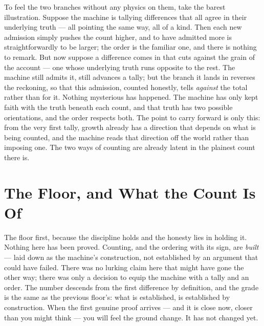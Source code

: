To feel the two branches without any physics on them, take the barest illustration. Suppose the machine is
tallying differences that all agree in their underlying truth --- all pointing the same way, all of a kind. Then
each new admission simply pushes the count higher, and to have admitted more is straightforwardly to be larger;
the order is the familiar one, and there is nothing to remark. But now suppose a difference comes in that cuts
against the grain of the account --- one whose underlying truth runs opposite to the rest. The machine still
admits it, still advances a tally; but the branch it lands in reverses the reckoning, so that this admission,
counted honestly, tells \emph{against} the total rather than for it. Nothing mysterious has happened. The machine
has only kept faith with the truth beneath each count, and that truth has two possible orientations, and the
order respects both. The point to carry forward is only this: from the very first tally, growth already has a
direction that depends on what is being counted, and the machine reads that direction off the world rather than
imposing one. The two ways of counting are already latent in the plainest count there is.

\section{The Floor, and What the Count Is Of}

The floor first, because the discipline holds and the honesty lies in holding it. Nothing here has been proved.
Counting, and the ordering with its sign, are \emph{built} --- laid down as the machine's
construction, not established by an argument that could have failed. There was no lurking claim here that might
have gone the other way; there was only a decision to equip the machine with a tally and an order. The number
descends from the first difference by definition, and the grade is the same as the previous floor's: what is
established, is established by construction. When the first genuine proof arrives --- and it is close now, closer
than you might think --- you will feel the ground change. It has not changed yet.

